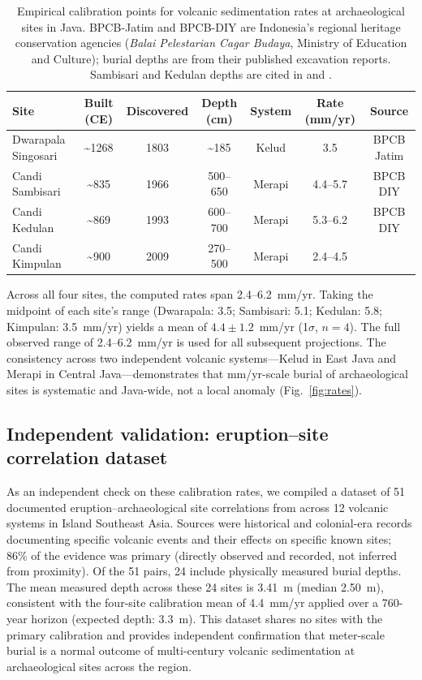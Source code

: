 \documentclass[12pt,a4paper]{article}
\begin{document}
\begin{table}[t]
\caption{Empirical calibration points for volcanic sedimentation rates at archaeological sites in Java. BPCB-Jatim and BPCB-DIY are Indonesia's regional heritage conservation agencies (\textit{Balai Pelestarian Cagar Budaya}, Ministry of Education and Culture); burial depths are from their published excavation reports. Sambisari and Kedulan depths are cited in \citet{lavigne2000} and \citet{thouret2000}.}
\label{tab:calibration}
\begin{tabular}{lcccccc}
\toprule
Site & Built (CE) & Discovered & Depth (cm) & System & Rate (mm/yr) & Source \\
\midrule
Dwarapala Singosari & \textasciitilde1268 & 1803 & \textasciitilde185 & Kelud & 3.5 & BPCB Jatim \\
Candi Sambisari & \textasciitilde835 & 1966 & 500--650 & Merapi & 4.4--5.7 & BPCB DIY \\
Candi Kedulan & \textasciitilde869 & 1993 & 600--700 & Merapi & 5.3--6.2 & BPCB DIY \\
Candi Kimpulan & \textasciitilde900 & 2009 & 270--500 & Merapi & 2.4--4.5 & \citet{putra2019} \\
\bottomrule
\end{tabular}
\end{table}

Across all four sites, the computed rates span 2.4--6.2~mm/yr. Taking the midpoint of each site's range (Dwarapala: 3.5; Sambisari: 5.1; Kedulan: 5.8; Kimpulan: 3.5~mm/yr) yields a mean of $4.4 \pm 1.2$~mm/yr (1$\sigma$, $n=4$). The full observed range of 2.4--6.2~mm/yr is used for all subsequent projections. The consistency across two independent volcanic systems---Kelud in East Java and Merapi in Central Java---demonstrates that mm/yr-scale burial of archaeological sites is systematic and Java-wide, not a local anomaly (Fig.~\ref{fig:rates}).

\subsection{Independent validation: eruption--site correlation dataset}

As an independent check on these calibration rates, we compiled a dataset of 51 documented eruption--archaeological site correlations from across 12 volcanic systems in Island Southeast Asia. Sources were historical and colonial-era records documenting specific volcanic events and their effects on specific known sites; 86\% of the evidence was primary (directly observed and recorded, not inferred from proximity). Of the 51 pairs, 24 include physically measured burial depths. The mean measured depth across these 24 sites is 3.41~m (median 2.50~m), consistent with the four-site calibration mean of 4.4~mm/yr applied over a 760-year horizon (expected depth: 3.3~m). This dataset shares no sites with the primary calibration and provides independent confirmation that meter-scale burial is a normal outcome of multi-century volcanic sedimentation at archaeological sites across the region.
\end{document}
